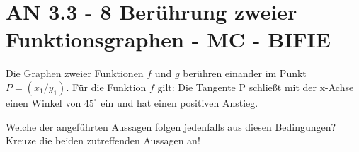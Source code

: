 \section{AN 3.3 - 8 Berührung zweier Funktionsgraphen - MC - BIFIE}

\begin{beispiel}[AN 3.3]{1} %
				Die Graphen zweier Funktionen $f$ und $g$ berühren einander im Punkt $P=(x_1/y_1)$. Für die Funktion $f$ gilt: Die Tangente P schließt mit der x-Achse einen Winkel von $45^\circ$ ein und hat einen positiven Anstieg.
				
				Welche der angeführten Aussagen folgen jedenfalls aus diesen Bedingungen? Kreuze die beiden zutreffenden Aussagen an!
				
\end{beispiel}
